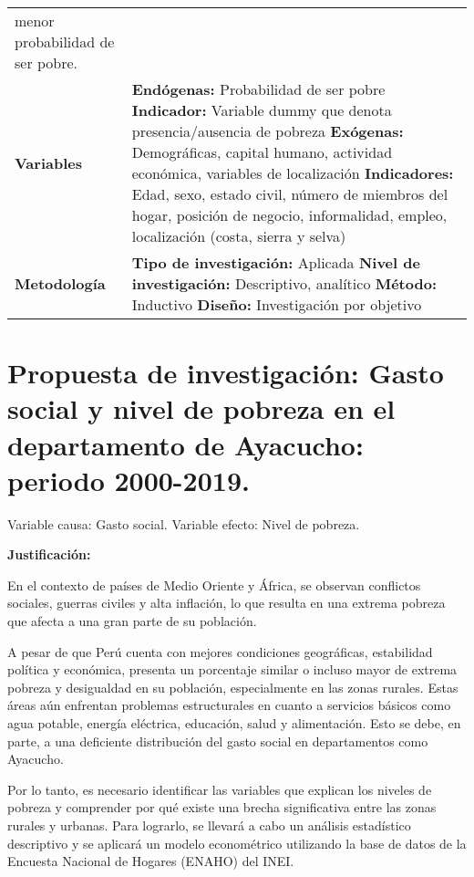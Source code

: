 \documentclass[
  letterpaper,
  DIV=11,
  numbers=noendperiod]{scrartcl}
\begin{document}
\begin{longtable}[]{@{}
  >{\raggedright\arraybackslash}p{}
  >{\raggedright\arraybackslash}p{}@{}}
menor probabilidad de ser pobre. \\
\textbf{Variables} & \textbf{Endógenas:} Probabilidad de ser pobre
\textbf{Indicador:} Variable dummy que denota presencia/ausencia de
pobreza \textbf{Exógenas:} Demográficas, capital humano, actividad
económica, variables de localización \textbf{Indicadores:} Edad, sexo,
estado civil, número de miembros del hogar, posición de negocio,
informalidad, empleo, localización (costa, sierra y selva) \\
\textbf{Metodología} & \textbf{Tipo de investigación:} Aplicada
\textbf{Nivel de investigación:} Descriptivo, analítico \textbf{Método:}
Inductivo \textbf{Diseño:} Investigación por objetivo \\
\end{longtable}

\hypertarget{propuesta-de-investigaciuxf3n-gasto-social-y-nivel-de-pobreza-en-el-departamento-de-ayacucho-periodo-2000-2019.}{%
\section{Propuesta de investigación: Gasto social y nivel de pobreza en
el departamento de Ayacucho: periodo
2000-2019.}\label{propuesta-de-investigaciuxf3n-gasto-social-y-nivel-de-pobreza-en-el-departamento-de-ayacucho-periodo-2000-2019.}}

Variable causa: Gasto social. Variable efecto: Nivel de pobreza.

\textbf{Justificación:}

En el contexto de países de Medio Oriente y África, se observan
conflictos sociales, guerras civiles y alta inflación, lo que resulta en
una extrema pobreza que afecta a una gran parte de su población.

A pesar de que Perú cuenta con mejores condiciones geográficas,
estabilidad política y económica, presenta un porcentaje similar o
incluso mayor de extrema pobreza y desigualdad en su población,
especialmente en las zonas rurales. Estas áreas aún enfrentan problemas
estructurales en cuanto a servicios básicos como agua potable, energía
eléctrica, educación, salud y alimentación. Esto se debe, en parte, a
una deficiente distribución del gasto social en departamentos como
Ayacucho.

Por lo tanto, es necesario identificar las variables que explican los
niveles de pobreza y comprender por qué existe una brecha significativa
entre las zonas rurales y urbanas. Para lograrlo, se llevará a cabo un
análisis estadístico descriptivo y se aplicará un modelo econométrico
utilizando la base de datos de la Encuesta Nacional de Hogares (ENAHO)
del INEI.
\end{document}
